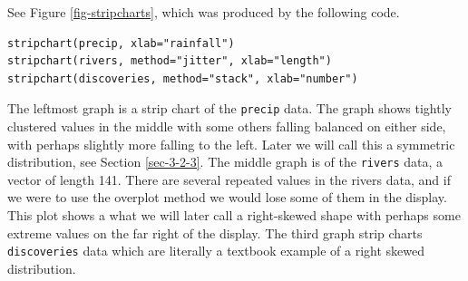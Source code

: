 \documentclass[captions=tableheading]{scrbook}
\begin{document}
See Figure \ref{fig-stripcharts}, which was produced by the following code.


\begin{verbatim}
stripchart(precip, xlab="rainfall")
stripchart(rivers, method="jitter", xlab="length")
stripchart(discoveries, method="stack", xlab="number")
\end{verbatim}

The leftmost graph is a strip chart of the \texttt{precip} data. The graph shows tightly clustered values in the middle with some others falling balanced on either side, with perhaps slightly more falling to the left. Later we will call this a symmetric distribution, see Section \ref{sec-3-2-3}. The middle graph is of the \texttt{rivers} data, a vector of length 141. There are several repeated values in the rivers data, and if we were to use the overplot method we would lose some of them in the display. This plot shows a what we will later call a right-skewed shape with perhaps some extreme values on the far right of the display. The third graph strip charts \texttt{discoveries} data which are literally a textbook example of a right skewed distribution.
\end{document}
